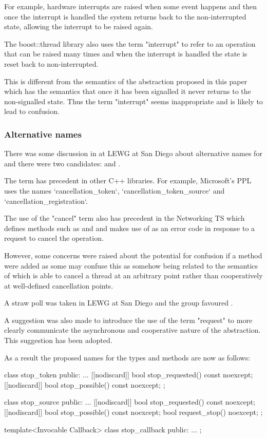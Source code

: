 For example, hardware interrupts are raised when some event happens and then
once the interrupt is handled the system returns back to the non-interrupted
state, allowing the interrupt to be raised again.

The boost::thread library also uses the term "interrupt" to refer to an operation
that can be raised many times and when the interrupt is handled the state is
reset back to non-interrupted.

This is different from the semantics of the abstraction proposed in this paper 
which has the semantics that once it has been signalled it never returns to
the non-signalled state. Thus the term "interrupt" seems inappropriate and is
likely to lead to confusion.

\subsubsection*{Alternative names}

There was some discussion in at LEWG at San Diego about alternative names
for  and there were two candidates:
 and .

The term  has precedent in other C++ libraries.
For example, Microsoft's PPL uses the names `cancellation_token`, `cancellation_token_source`
and `cancellation_registration`.

The use of the "cancel" term also has precedent in the Networking TS which defines methods
such as  and  and makes
use of  as an error code in response to a request to
cancel the operation.

However, some concerns were raised about the potential for confusion if a 
method were added as some may confuse this as somehow being related to the semantics of
 which is able to cancel a thread at an arbitrary point rather than
cooperatively at well-defined cancellation points.

A straw poll was taken in LEWG at San Diego and the group favoured .

A suggestion was also made to introduce the use of the term "request" to more clearly
communicate the asynchronous and cooperative nature of the abstraction. This suggestion
has been adopted.

As a result the proposed names for the types and methods are now as follows:
\begin{codeblock}
class stop_token {
 public:
  ...
  [[nodiscard]] bool stop_requested() const noexcept;
  [[nodiscard]] bool stop_possible() const noexcept;
};

class stop_source {
 public:
  ...
  [[nodiscard]] bool stop_requested() const noexcept;
  [[nodiscard]] bool stop_possible() const noexcept;
  bool request_stop() noexcept;
};

template<Invocable Callback>
class stop_callback {
 public:
  ...
};
\end{codeblock}

